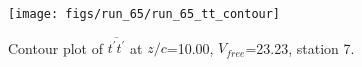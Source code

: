 \begin{figure}[H]
\centering
\texttt{[image: figs/run\_65/run\_65\_tt\_contour]}
\caption{Contour plot of $\overline{t^\prime t^\prime}$ at $z/c$=10.00, $V_{free}$=23.23, station 7.}
\label{fig:run_65_tt_contour}
\end{figure}


